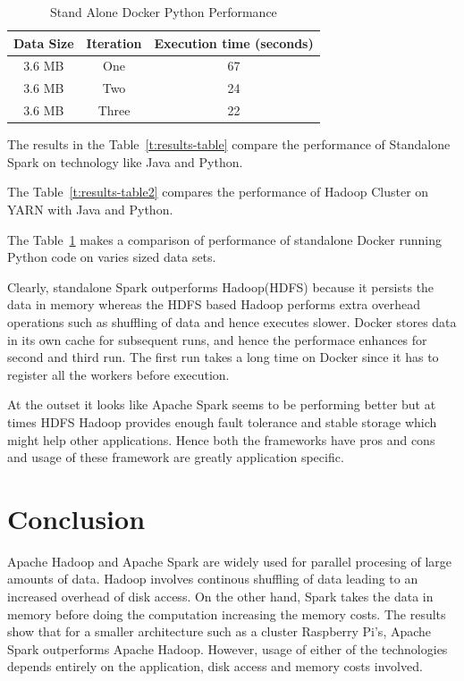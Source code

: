 \begin{table}[hbt]
\centering
\caption{Stand Alone Docker Python Performance}\label{t:results-table3}
    \begin{tabular}{ | c | c | c |}
    \hline
    Data Size & Iteration & Execution time (seconds) \\ \hline
    3.6 MB & One & 67  \\ \hline
    3.6 MB & Two & 24 \\ \hline
    3.6 MB & Three & 22 \\ \hline
    \end{tabular}
\end{table}


The results in the Table~\ref{t:results-table} compare the performance of
Standalone Spark on technology like Java and Python. 

The Table~\ref{t:results-table2} compares the performance of Hadoop Cluster on
YARN with Java and Python.

The Table~\ref{t:results-table3} makes a comparison of performance of standalone
Docker running Python code on varies sized data sets.

 Clearly, standalone Spark outperforms Hadoop(HDFS) because it persists 
 the data in memory whereas the HDFS based Hadoop performs extra overhead 
 operations such as shuffling of data and hence executes slower. 
 Docker stores data in its own cache for subsequent runs, and hence the 
 performace enhances for second and third run. The first run takes a long time 
 on Docker since it has to register all the workers before execution.

 At the outset it looks like Apache Spark seems to be performing better but at 
 times HDFS Hadoop provides enough fault tolerance and stable storage which 
 might help other applications. Hence both the frameworks have pros and cons and
 usage of these framework are greatly application specific. 


\section{Conclusion}
Apache Hadoop and Apache Spark are widely used for parallel procesing of large 
amounts of data. Hadoop involves continous shuffling of data leading to an
increased overhead of disk access. On the other hand, Spark takes the data in 
memory before doing the computation increasing the memory costs. The results
show that for a smaller architecture such as a cluster Raspberry Pi's, Apache 
Spark outperforms Apache Hadoop. However, usage of either of the technologies 
depends entirely on the application, disk access and memory costs involved.


